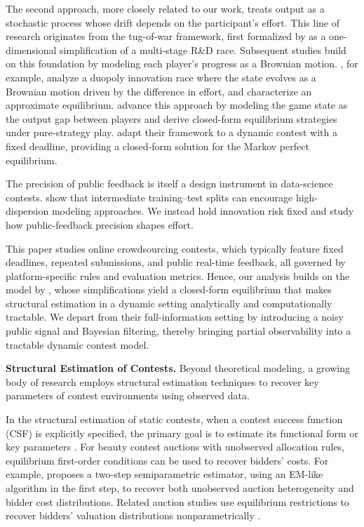 \documentclass[mnsc]{informs3}
\begin{document}
The second approach, more closely related to our work, treats output as a stochastic process whose drift depends on the participant’s effort.
This line of research originates from the tug-of-war framework, first formalized by \citet{Harris1987Race} as a one-dimensional simplification of a multi-stage R\&D race.
Subsequent studies build on this foundation by modeling each player’s progress as a Brownian motion.
\citet{budd1993Duopoly}, for example, analyze a duopoly innovation race where the state evolves as a Brownian motion driven by the difference in effort, and characterize an approximate equilibrium.
\citet{Moscarini2007Contest} advance this approach by modeling the game state as the output gap between players and derive closed-form equilibrium strategies under pure-strategy play.
\citet{Ryvkin2022Fight} adapt their framework to a dynamic contest with a fixed deadline, providing a closed-form solution for the Markov perfect equilibrium.

The precision of public feedback is itself a design instrument in data-science contests. 
\citet{huang_2024_designing} show that intermediate training–test splits can encourage high-dispersion modeling approaches.
We instead hold innovation risk fixed and study how public-feedback precision shapes effort.


This paper studies online crowdsourcing contests, which typically feature fixed deadlines, repeated submissions, and public real-time feedback, all governed by platform-specific rules and evaluation metrics.
Hence, our analysis builds on the model by \citet{Ryvkin2022Fight}, whose simplifications yield a closed-form equilibrium that makes structural estimation in a dynamic setting analytically and computationally tractable.
We depart from their full-information setting by introducing a noisy public signal and Bayesian filtering, thereby bringing partial observability into a tractable dynamic contest model.



\textbf{Structural Estimation of Contests.}
Beyond theoretical modeling, a growing body of research employs structural estimation techniques to recover key parameters of contest environments using observed data.

In the structural estimation of static contests, when a contest success function (CSF) is explicitly specified, the primary goal is to estimate its functional form or key parameters \citep{hwang2012technology, kang2016policy, huang2021structural}.
For beauty contest auctions with unobserved allocation rules, equilibrium first-order conditions can be used to recover bidders' costs.
For example, \citet{yoganarasimhan2016estimation} proposes a two-step semiparametric estimator, using an EM-like algorithm in the first step, to recover both unobserved auction heterogeneity and bidder cost distributions.
Related auction studies use equilibrium restrictions to recover bidders' valuation distributions nonparametrically \citep{guerre2000optimal, shakhgildyan2022nonparametric}.
\end{document}

